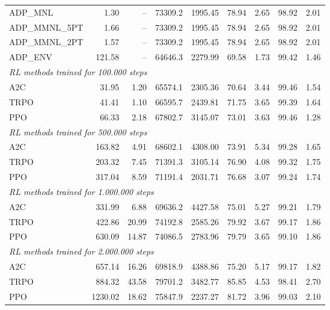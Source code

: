 \begin{samepage}
\begin{center}
\begin{tabular}{l|rr|rr|rr|rr}
    \midrule
    ADP\_MNL     &     1.30 &    -- &    73309.2 &    1995.45 &   78.94 &    2.65 &   98.92 &    2.01 \\
    ADP\_MMNL\_5PT &     1.66 &    -- &    73309.2 &    1995.45 &   78.94 &    2.65 &   98.92 &    2.01 \\
    ADP\_MMNL\_2PT &     1.57 &    -- &    73309.2 &    1995.45 &   78.94 &    2.65 &   98.92 &    2.01 \\
    ADP\_ENV     &   121.58 &    -- &    64646.3 &    2279.99 &   69.58 &    1.73 &   99.42 &    1.46 \\
    \midrule
    \multicolumn{9}{l}{\textit{RL methods trained for 100.000 steps}} \\
    \midrule
    A2C          &    31.95 &     1.20 &    65574.1 &    2305.36 &   70.64 &    3.44 &   99.46 &    1.54 \\
    TRPO         &    41.41 &     1.10 &    66595.7 &    2439.81 &   71.75 &    3.65 &   99.39 &    1.64 \\
    PPO          &    66.33 &     2.18 &    67802.7 &    3145.07 &   73.01 &    3.63 &   99.46 &    1.28 \\
    \midrule
    \multicolumn{9}{l}{\textit{RL methods trained for 500.000 steps}} \\
    \midrule
    A2C          &   163.82 &     4.91 &    68602.1 &    4308.00 &   73.91 &    5.34 &   99.28 &    1.65 \\
    TRPO         &   203.32 &     7.45 &    71391.3 &    3105.14 &   76.90 &    4.08 &   99.32 &    1.75 \\
    PPO          &   317.04 &     8.59 &    71191.4 &    2031.71 &   76.68 &    3.07 &   99.24 &    1.74 \\
    \midrule
    \multicolumn{9}{l}{\textit{RL methods trained for 1.000.000 steps}} \\
    \midrule
    A2C          &   331.99 &     6.88 &    69636.2 &    4427.58 &   75.01 &    5.27 &   99.21 &    1.79 \\
    TRPO         &   422.86 &    20.99 &    74192.8 &    2585.26 &   79.92 &    3.67 &   99.17 &    1.86 \\
    PPO          &   630.09 &    14.87 &    74086.5 &    2783.96 &   79.79 &    3.65 &   99.10 &    1.86 \\
    \midrule
    \multicolumn{9}{l}{\textit{RL methods trained for 2.000.000 steps}} \\
    \midrule
    A2C          &   657.14 &    16.26 &    69818.9 &    4388.86 &   75.20 &    5.17 &   99.17 &    1.82 \\
    TRPO         &   884.32 &    43.58 &    79701.2 &    3482.77 &   85.85 &    4.53 &   98.41 &    2.70 \\
    PPO          &  1230.02 &    18.62 &    75847.9 &    2237.27 &   81.72 &    3.96 &   99.03 &    2.10 \\
    \bottomrule
  \end{tabular}
\end{center}
\end{samepage}

